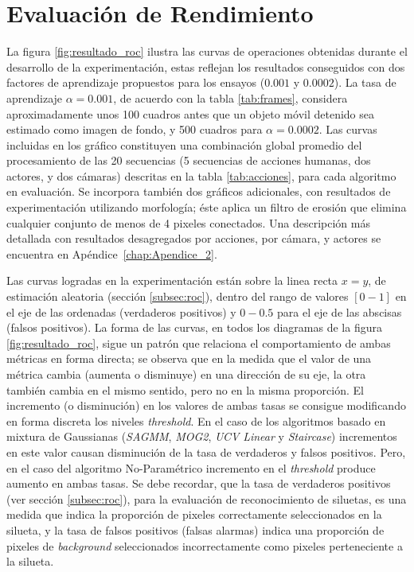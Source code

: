 \section{Evaluación de Rendimiento}

La figura \ref{fig:resultado_roc} ilustra las curvas de operaciones obtenidas durante el desarrollo de la experimentación, estas reflejan los resultados conseguidos con dos factores de aprendizaje propuestos para los ensayos ($0.001$ y $0.0002$). La tasa de aprendizaje $\alpha=0.001$, de acuerdo con la tabla \ref{tab:frames}, considera aproximadamente unos 100 cuadros antes que un objeto móvil detenido sea estimado como imagen de fondo, y 500 cuadros para $\alpha=0.0002$. Las curvas incluidas en los gráfico constituyen una combinación global promedio del procesamiento de las 20 secuencias (5 secuencias de acciones humanas, dos actores, y dos cámaras) descritas en la tabla \ref{tab:acciones}, para cada algoritmo en evaluación. Se incorpora también dos gráficos adicionales, con resultados de experimentación utilizando morfología; éste aplica un filtro de erosión que elimina cualquier conjunto de menos de 4 pixeles conectados. Una descripción más detallada con resultados desagregados por acciones, por cámara, y actores se encuentra en Apéndice~\ref{chap:Apendice_2}.

Las curvas logradas en la experimentación están sobre la linea recta $x=y$, de estimación aleatoria (sección \ref{subsec:roc}), dentro del rango de valores $[0-1]$ en el eje de las ordenadas (verdaderos positivos) y $0-0.5$ para el eje de las abscisas (falsos positivos). La forma de las curvas, en todos los diagramas de la figura \ref{fig:resultado_roc}, sigue un patrón que relaciona el comportamiento de ambas métricas en forma directa; se observa que en la medida que el valor de una métrica cambia (aumenta o disminuye) en una dirección de su eje, la otra también cambia en el mismo sentido, pero no en la misma proporción. El incremento (o disminución) en los valores de ambas tasas se consigue modificando en forma discreta los niveles \textit{threshold}. En el caso de los algoritmos basado en mixtura de Gaussianas (\textit{SAGMM}, \textit{MOG2}, \textit{UCV} \textit{Linear} y \textit{Staircase}) incrementos en este valor causan disminución de la tasa de verdaderos y falsos positivos. Pero, en el caso del algoritmo No-Paramétrico incremento en el \textit{threshold} produce aumento en ambas tasas. Se debe recordar, que la tasa de verdaderos positivos (ver sección \ref{subsec:roc}), para la evaluación de reconocimiento de siluetas, es una medida que indica la proporción de pixeles correctamente seleccionados en la silueta, y la tasa de falsos positivos (falsas alarmas) indica una proporción de pixeles de \textit{background} seleccionados incorrectamente como pixeles perteneciente a la silueta. 

